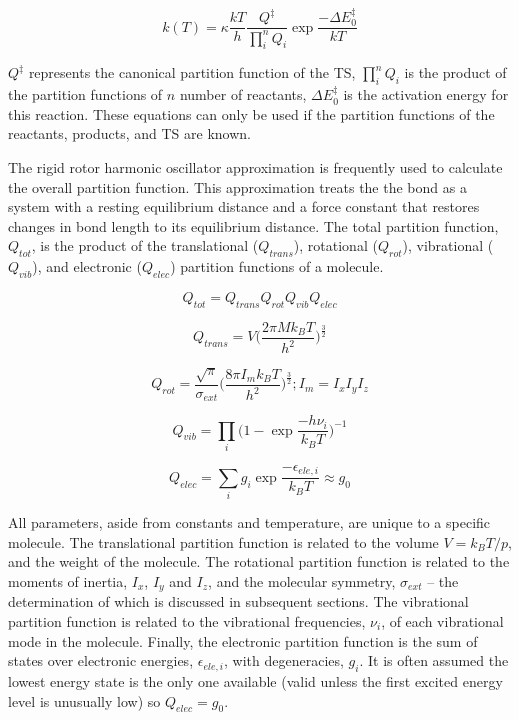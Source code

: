 \documentclass[preprint, 11pt]{elsarticle} %
\begin{document}
\begin{equation}
    k(T) = \kappa \frac{k T}{h} \frac{Q^\ddagger}{\prod^{n}_{i} Q_i} \exp{\frac{-\Delta E^{\ddagger}_{0}}{k T}}
    \label{eyring:2}
\end{equation}

$Q^\ddagger$ represents the canonical partition function of the TS, $\prod^n_i Q_i$ is the product of the partition functions of $n$ number of reactants, $\Delta E^{\ddagger}_0$ is the activation energy for this reaction.
These equations can only be used if the partition functions of the reactants, products, and TS are known. 

The rigid rotor harmonic oscillator approximation is frequently used to calculate the overall partition function.
This approximation treats the the bond as a system with a resting equilibrium distance and a force constant that restores changes in bond length to its equilibrium distance.
The total partition function, $Q_{tot}$, is the product of the translational ($Q_{trans}$), rotational ($Q_{rot}$), vibrational ($Q_{vib}$), and electronic ($Q_{elec}$) partition functions of a molecule. 

\begin{equation}
    Q_{tot} = Q_{trans} Q_{rot} Q_{vib} Q_{elec}
    \label{qtot}
\end{equation}

\begin{equation}
    Q_{trans} = V \bigg( \frac{2 \pi M k_B T}{h^2} \bigg)^{\frac{3}{2}}
    \label{qtrans}
\end{equation}

\begin{equation}
    Q_{rot} = \frac{\sqrt{\pi}}{\sigma_{ext}} \bigg( \frac{8 \pi I_m k_B T}{h^2} \bigg)^{\frac{3}{2}} ; I_m = I_x I_y I_z
    \label{qrot}
\end{equation}

\begin{equation}
    Q_{vib} = \prod_i \bigg(1- \exp{\frac{-h \nu_i}{k_B T}} \bigg)^{-1}
    \label{qvib}
\end{equation}

\begin{equation}
    Q_{elec} = \sum_i g_i \exp{\frac{ -\epsilon_{ele,i}}{k_B T}} \approx g_0
    \label{qelec}
\end{equation}

All parameters, aside from constants and temperature, are unique to a specific molecule.
The translational partition function is related to the volume  $V = k_B T/p$, and the  weight of the molecule.
The rotational partition function is related to the moments of inertia, $I_x$, $I_y$ and $I_z$, and the molecular symmetry, $\sigma_{ext}$ -- the determination of which is discussed in subsequent sections.
The vibrational partition function is related to the vibrational frequencies, $\nu_i$, of each vibrational mode in the molecule.
Finally, the electronic partition function is the sum of states over electronic energies, $\epsilon_{ele,i}$, with degeneracies, $g_i$. 
It is often assumed the lowest energy state is the only one available (valid unless the first excited energy level is unusually low) so $Q_{elec}=g_0$.
\end{document}
